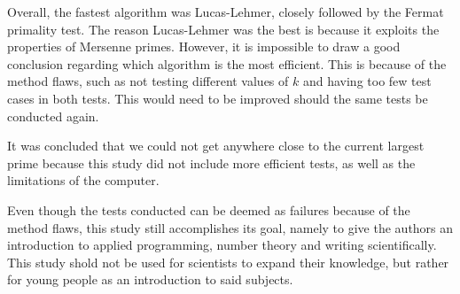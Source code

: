 \documentclass[main.tex]{subfiles}
\begin{document}
Overall, the fastest algorithm was Lucas-Lehmer, closely followed by the Fermat
primality test. The reason Lucas-Lehmer was the best is because it exploits the
properties of Mersenne primes. However, it is impossible to draw a good
conclusion regarding which algorithm is the most efficient. This is because of the method flaws, such as not testing different values
of $k$ and having too few test cases in both tests. This would need to be improved
should the same tests be conducted again.

It was concluded that we could not get anywhere close to the current largest
prime because this study did not include more efficient tests, as well as the
limitations of the computer.

Even though the tests conducted can be deemed as failures because of the method
flaws, this study still accomplishes its goal, namely to give the authors an
introduction to applied programming, number theory and writing scientifically.
This study shold not be used for scientists to expand their knowledge, but
rather for young people as an introduction to said subjects.
\end{document}
